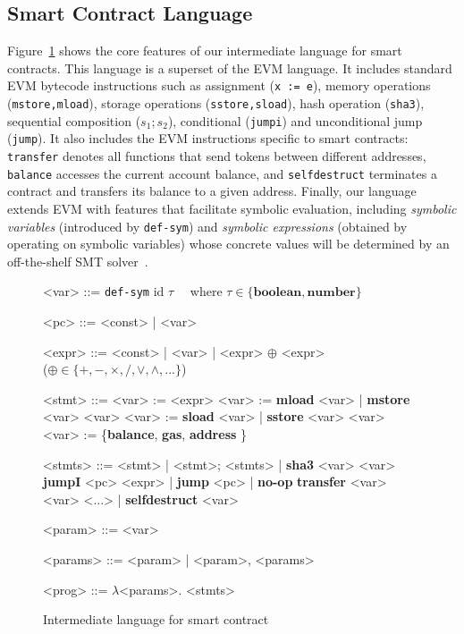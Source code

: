 \subsection{Smart Contract Language}\label{sec:lang}

Figure~\ref{fig:grammar} shows the core features of our intermediate language
for smart contracts. This language is a superset of the EVM language. It includes
standard EVM bytecode instructions such as assignment (\texttt{x := e}), memory operations
(\texttt{mstore,mload}), storage operations (\texttt{sstore,sload}), hash
operation (\texttt{sha3}), sequential composition (\texttt{$s_1;s_2$}),
conditional (\texttt{jumpi}) and unconditional jump (\texttt{jump}). It also
includes the EVM instructions specific to smart contracts: \texttt{transfer}
denotes all functions that send tokens between different addresses, \texttt{balance} accesses the current account
balance, and \texttt{selfdestruct} terminates a contract and transfers its
balance to a given address. Finally, our language extends EVM with features that
facilitate symbolic evaluation, including \emph{symbolic variables} (introduced
by \texttt{def-sym}) and \emph{symbolic expressions} (obtained by operating on
symbolic variables) whose concrete values will be determined by an off-the-shelf
SMT solver~\cite{NiemetzPreinerBiere-JSAT15}.

\begin{figure}[!t]
    \setlength{\grammarparsep}{0em}
    \begin{grammar}
    \small
<var>  ::= \texttt{def-sym} id $\tau$  \ \ where 
$\tau\in\{\textbf{boolean}, \textbf{number}\}\quad$

<pc>   ::= <const> | <var>

<expr> ::= <const> | <var> | <expr> $\oplus$ <expr> \\
($\oplus\in\{+, -, \times, /, \vee, \wedge, ...\}$)

<stmt> ::=  <var> := <expr> 
  \alt <var> := \textbf{mload} <var> | \textbf{mstore} <var> <var>
  \alt <var> := \textbf{sload} <var> | \textbf{sstore} <var> <var>
  \alt <var> := \{\textbf{balance}, \textbf{gas}, \textbf{address} \}

<stmts> ::= <stmt> | <stmt>; <stmts> | \textbf{sha3} <var> <var>
\alt \textbf{jumpI} <pc> <expr> | \textbf{jump} <pc> | \textbf{no-op}
\alt \textbf{transfer} <var> <var> <...> | \textbf{selfdestruct} <var>

<param> ::= <var> 

<params> ::= <param> | <param>, <params> 

<prog> ::= $\lambda$<params>. <stmts> 
\end{grammar}
\caption{Intermediate language for smart contract}
\vspace{-0.1in}
\label{fig:grammar}
\end{figure}


